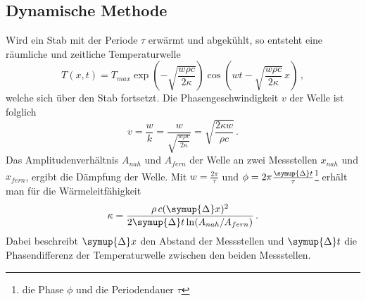 \subsection{Dynamische Methode}
\label{sec:dyM}
Wird ein Stab mit der Periode $\tau$ erwärmt und abgekühlt, so entsteht eine räumliche und zeitliche Temperaturwelle
\begin{equation}
    T(x,t)=T_{max} \exp \left({-\sqrt{\frac{w \rho c}{2 \kappa}}}\right)\cos \left( wt-\sqrt{\frac{w \rho c}{2 \kappa}}\, x\right)\, ,
\end{equation}
welche sich über den Stab fortsetzt. Die Phasengeschwindigkeit $v$ der Welle ist folglich
\begin{equation}
    v=\frac{w}{k}=\frac{w}{\sqrt{\frac{w \rho c}{2 \kappa}}}=\sqrt{\frac{2\kappa w}{\rho c}}\, .
\end{equation}
Das Amplitudenverhältnis $A_{nah}$ und $A_{fern}$ der Welle an zwei Messstellen $x_{nah}$ und $x_{fern}$, ergibt die Dämpfung der Welle.
Mit $w=\frac{2\pi}{\tau}$ und $\phi=2\pi \frac{\symup{\Delta}t}{\tau}$\footnote{die Phase $\phi$ und die Periodendauer $\tau$} erhält man für die Wärmeleitfähigkeit
\begin{equation}
    \kappa=\frac{\rho\, c (\symup{\Delta}x)^2}{2\symup{\Delta}t \ln (A_{nah}/A_{fern})}\, .
\end{equation}
Dabei beschreibt $\symup{\Delta}x$ den Abstand der Messstellen und $\symup{\Delta}t$ die Phasendifferenz der Temperaturwelle zwischen den beiden Messstellen.
\cite{sample}
